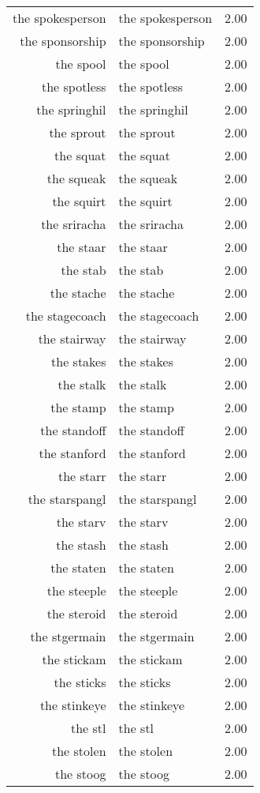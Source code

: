 \begin{table}[ht]
\begin{tabular}{rlr}
  the spokesperson & the spokesperson & 2.00 \\ 
  the sponsorship & the sponsorship & 2.00 \\ 
  the spool & the spool & 2.00 \\ 
  the spotless & the spotless & 2.00 \\ 
  the springhil & the springhil & 2.00 \\ 
  the sprout & the sprout & 2.00 \\ 
  the squat & the squat & 2.00 \\ 
  the squeak & the squeak & 2.00 \\ 
  the squirt & the squirt & 2.00 \\ 
  the sriracha & the sriracha & 2.00 \\ 
  the staar & the staar & 2.00 \\ 
  the stab & the stab & 2.00 \\ 
  the stache & the stache & 2.00 \\ 
  the stagecoach & the stagecoach & 2.00 \\ 
  the stairway & the stairway & 2.00 \\ 
  the stakes & the stakes & 2.00 \\ 
  the stalk & the stalk & 2.00 \\ 
  the stamp & the stamp & 2.00 \\ 
  the standoff & the standoff & 2.00 \\ 
  the stanford & the stanford & 2.00 \\ 
  the starr & the starr & 2.00 \\ 
  the starspangl & the starspangl & 2.00 \\ 
  the starv & the starv & 2.00 \\ 
  the stash & the stash & 2.00 \\ 
  the staten & the staten & 2.00 \\ 
  the steeple & the steeple & 2.00 \\ 
  the steroid & the steroid & 2.00 \\ 
  the stgermain & the stgermain & 2.00 \\ 
  the stickam & the stickam & 2.00 \\ 
  the sticks & the sticks & 2.00 \\ 
  the stinkeye & the stinkeye & 2.00 \\ 
  the stl & the stl & 2.00 \\ 
  the stolen & the stolen & 2.00 \\ 
  the stoog & the stoog & 2.00 \\ 

\end{tabular}
\end{table}
